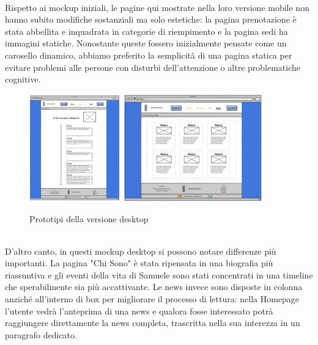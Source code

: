 \documentclass{article}
\begin{document}
\\Rispetto ai mockup iniziali, le pagine qui mostrate nella loro versione mobile non hanno subito modifiche sostanziali ma solo estetiche: la pagina prenotazione è stata abbellita e inquadrata in categorie di riempimento e la pagina sedi ha immagini statiche. Nonostante queste fossero inizialmente pensate come un carosello dinamico, abbiamo preferito la semplicità di una pagina statica per evitare problemi alle persone con disturbi dell'attenzione o altre problematiche cognitive.
\begin{figure} [h] \label{fig:mockup_desktop}
    \centering
    \includegraphics[width=0.35\textwidth]{immagini/about_desktop.jpg}
    \includegraphics[width=0.54\textwidth]{immagini/news_desktop.jpg}
    \caption{Prototipi della versione desktop}
\end{figure}
\\D'altro canto, in questi mockup desktop si possono notare differenze più importanti. La pagina "Chi Sono" è stata ripensata in una biografia più riassuntiva e gli eventi della vita di Samuele sono stati concentrati in una timeline che sperabilmente sia più accattivante. Le news invece sono disposte in colonna anziché all'interno di box per migliorare il processo di lettura: nella Homepage l'utente vedrà l'anteprima di una news e qualora fosse interessato potrà raggiungere direttamente la news completa, trascritta nella sua interezza in un paragrafo dedicato.
\end{document}
